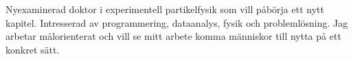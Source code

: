 

\begin{cvparagraph}

Nyexaminerad doktor i experimentell partikelfysik som vill p{\aa}b{\"o}rja ett nytt kapitel. %
Intresserad av programmering, dataanalys, fysik och problemlösning. 
Jag arbetar målorienterat och vill se mitt arbete komma människor till nytta på ett konkret sätt.
\end{cvparagraph}